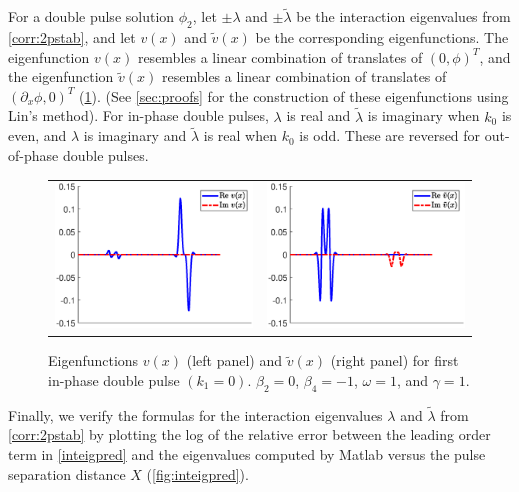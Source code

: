\documentclass[12pt]{elsarticle}
\begin{document}
For a double pulse solution $\phi_2$, let $\pm \lambda$ and $\pm \tilde{\lambda}$ be the interaction eigenvalues from \cref{corr:2pstab}, and let $v(x)$ and $\tilde{v}(x)$ be the corresponding eigenfunctions. The eigenfunction $v(x)$ resembles a linear combination of translates of $(0, \phi)^T$, and the eigenfunction $\tilde{v}(x)$ resembles a linear combination of translates of $(\partial_x \phi, 0)^T$ (\cref{fig:doublevrvi}).  (See \cref{sec:proofs} for the construction of these eigenfunctions using Lin's method). For in-phase double pulses, $\lambda$ is real and $\tilde{\lambda}$ is imaginary when $k_0$ is even, and $\lambda$ is imaginary and $\tilde{\lambda}$ is real when $k_0$ is odd. These are reversed for out-of-phase double pulses.

\begin{figure}[H]
\centering
\begin{tabular}{cc}
\includegraphics[width=8cm]{images/DP0ppvr} &
\includegraphics[width=8cm]{images/DP0ppvi}
\end{tabular}
\caption{Eigenfunctions $v(x)$ (left panel) and $\tilde{v}(x)$ (right panel) for first in-phase double pulse $(k_1 = 0)$. $\beta_2 = 0$, $\beta_4 = -1$, $\omega = 1$, and $\gamma = 1$.}
\label{fig:doublevrvi}
\end{figure}

Finally, we verify the formulas for the interaction eigenvalues $\lambda$ and $\tilde{\lambda}$ from \cref{corr:2pstab} by plotting the log of the relative error between the leading order term in \cref{inteigpred} and the eigenvalues computed by Matlab versus the pulse separation distance $X$ (\cref{fig:inteigpred}). 
\end{document}
